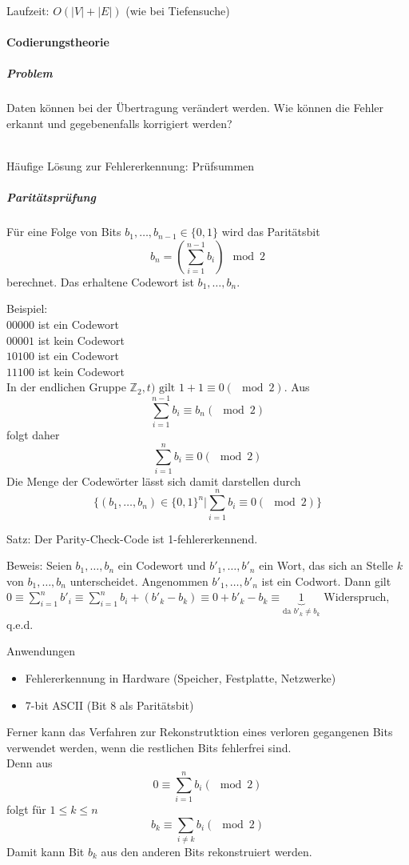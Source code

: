 \documentclass[a4paper]{scrartcl}
\begin{document}
Laufzeit: $O(\lvert V \rvert + \lvert E \rvert)$ (wie bei Tiefensuche)

\paragraph{Codierungstheorie} 
\subparagraph{Problem} Daten können bei der Übertragung verändert werden. Wie können die Fehler erkannt und gegebenenfalls korrigiert werden?\\
\\
Häufige Lösung zur Fehlererkennung: Prüfsummen

\subparagraph{Paritätsprüfung} Für eine Folge von Bits $b_1,\dots, b_{n-1} \in \{ 0,1\}$ wird das Paritätsbit 
\[ b_n = ( \sum\limits_{i=1}^{n-1} b_i) \mod{2} \]
berechnet. Das erhaltene Codewort ist $b_1,\dots,b_n$.

Beispiel:\\
$00000$ ist ein Codewort\\
$00001$ ist kein Codewort\\
$10100$ ist ein Codewort\\
$11100$ ist kein Codewort\\

In der endlichen Gruppe $\mathbb{Z}_2,t) \text{ gilt } 1+1 \equiv 0 ( \mod{2})$. Aus
\[ \sum\limits_{i=1}^{n-1} b_i \equiv b_n (\mod{2})\]
folgt daher
\[ \sum\limits_{i=1}^{n} b_i \equiv 0 (\mod{2} )\]
Die Menge der Codewörter lässt sich damit darstellen durch
\[\{ (b_1,\dots,b_n)\in \{ 0,1\}^n | \sum\limits_{i=1}^{n} b_i \equiv 0 (\mod{2} ) \} \]

Satz: Der Parity-Check-Code ist 1-fehlererkennend.

Beweis: Seien $b_1,\dots,b_n$ ein Codewort und $b'_1,\dots,b'_n$ ein Wort, das sich an Stelle $k$ von $b_1,\dots,b_n$ unterscheidet. Angenommen $b'_1,\dots,b'_n$ ist ein Codwort. Dann gilt $0 \equiv \sum\limits_{i=1}^{n} b'_i \equiv \sum\limits_{i=1}^{n} b_i + (b'_k - b_k) \equiv 0 + b'_k - b_k \equiv \underbrace{1}_{\text{da } b'_k \neq b_k}$ Widerspruch, q.e.d.

Anwendungen
\begin{itemize}
\item Fehlererkennung in Hardware (Speicher, Festplatte, Netzwerke)
\item 7-bit ASCII (Bit 8 als Paritätsbit)
\end{itemize}
Ferner kann das Verfahren zur Rekonstrutktion eines verloren gegangenen Bits verwendet werden, wenn die restlichen Bits fehlerfrei sind.\\
Denn aus
\[ 0 \equiv \sum\limits_{i=1}^{n} b_i (\mod{2})\]
folgt für $1 \leq k \leq n$
\[b_k \equiv \sum\limits_{i \neq k} b_i (\mod{2})\]
Damit kann Bit $b_k$ aus den anderen Bits rekonstruiert werden.
\end{document}
